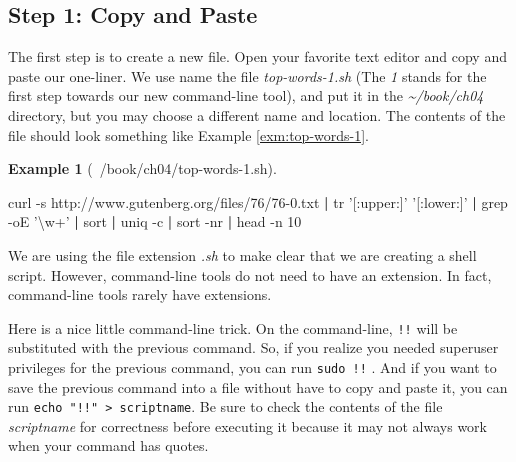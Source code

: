 \documentclass[
]{book}
\newenvironment{Shaded}{\begin{snugshade}}{\end{snugshade}}
\newcommand{\ExtensionTok}[1]{#1}
\newcommand{\FunctionTok}[1]{\textcolor[rgb]{0.00,0.00,0.00}{#1}}
\newcommand{\KeywordTok}[1]{\textcolor[rgb]{0.13,0.29,0.53}{\textbf{#1}}}
\newcommand{\NormalTok}[1]{#1}
\newcommand{\StringTok}[1]{\textcolor[rgb]{0.31,0.60,0.02}{#1}}
\theoremstyle{definition}
\theoremstyle{definition}
\newtheorem{example}{Example}[chapter]
\theoremstyle{definition}
\theoremstyle{remark}
\begin{document}
\hypertarget{step-1-copy-and-paste}{%
\subsection{Step 1: Copy and Paste}\label{step-1-copy-and-paste}}

The first step is to create a new file. Open your favorite text editor and copy and paste our one-liner. We use name the file \emph{top-words-1.sh} (The \emph{1} stands for the first step towards our new command-line tool), and put it in the \emph{\textasciitilde{}/book/ch04} directory, but you may choose a different name and location. The contents of the file should look something like Example \ref{exm:top-words-1}.

\begin{example}[~/book/ch04/top-words-1.sh]
\protect\hypertarget{exm:top-words-1}{}{\label{exm:top-words-1} {} }
\end{example}

\begin{Shaded}
\begin{Highlighting}[]
\ExtensionTok{curl}\NormalTok{ -s http://www.gutenberg.org/files/76/76-0.txt }\KeywordTok{|}
\FunctionTok{tr} \StringTok{'[:upper:]'} \StringTok{'[:lower:]'} \KeywordTok{|} \FunctionTok{grep}\NormalTok{ -oE }\StringTok{'\textbackslash{}w+'} \KeywordTok{|} \FunctionTok{sort} \KeywordTok{|}
\FunctionTok{uniq}\NormalTok{ -c }\KeywordTok{|} \FunctionTok{sort}\NormalTok{ -nr }\KeywordTok{|} \FunctionTok{head}\NormalTok{ -n 10}
\end{Highlighting}
\end{Shaded}

We are using the file extension \emph{.sh} to make clear that we are creating a shell script. However, command-line tools do not need to have an extension. In fact, command-line tools rarely have extensions.

\begin{rmdtip}
Here is a nice little command-line trick. On the command-line, \texttt{!!} will be substituted with the previous command. So, if you realize you needed superuser privileges for the previous command, you can run \texttt{sudo\ !!} \citep{sudo}. And if you want to save the previous command into a file without have to copy and paste it, you can run \texttt{echo\ "!!"\ \textgreater{}\ scriptname}. Be sure to check the contents of the file \emph{scriptname} for correctness before executing it because it may not always work when your command has quotes.
\end{rmdtip}
\end{document}
